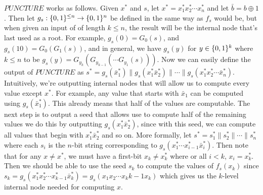 \documentclass{article}
\begin{document}
\begin{enumerate}
\begin{enumerate}[,label=\alph*.]
$PUNCTURE$ works as follows. Given $x^*$ and $s$, let $x^* = x^*_1 x^*_2 \cdots x^*_n$ and let $\bar{b} = b \oplus 1$. 
Then let $g_s: \{0,1\}^{\leq n} \to \{0,1\}^n$ be defined in the same way as $f_s$ would be, but when given an
input of of length $k \leq n$, the result will be the internal node that's last used as a root. For
example, $g_s(0) = G_0(s)$, and $g_s(10) = G_0(G_1(s))$, and in general, we have $g_s(y)$ for $y \in \{0,1\}^k$
where $k \leq n$ to be $g_s(y) = G_{y_k}(G_{y_{k-1}}(\cdots G_{y_1}(s)))$. Now we can easily
define the output of $PUNCTURE$ as $s^* = g_s(\bar{x}_1^*) \| g_s(x_1^*\bar{x}_2^*) \| \cdots  \| g_s(x_1^*x_2^* \cdots \bar{x}_{n}^*)$.
Intuitively, we're outputting internal nodes that will allow us to compute every value except $x^*$.
For example, any value that starts with $\bar{x}_1$ can be computed using $g_s(\bar{x}_1^*)$. This
already means that half of the values are computable. The next step is to output a seed that allows
use to compute half of the remaining
values \textendash{} we do this by outputting $g_s(x_1^*\bar{x}_2^*)$, since with this seed, we can compute
all values that begin with $x_1^*\bar{x}_2^*$ and so on. More formally, let $s^* = s_1^* \| s_2^* \| \cdots \| s_n^*$
where each $s_i$ is the $n$-bit string corresponding to $g_s(x_1^*\cdots x_{i-1}^*\bar{x}_i^*)$. Then
note that for any $x \neq x^*$, we must have a first-bit $x_k \neq x_k^*$ where or all $i < k$, $x_i = x_k^*$. 
Then we should be able to use the seed $s_k$ to compute the values of $f_s(x_k)$ since 
$s_k = g_s(x_1^*x_2^*\cdots x_{k-1}^*\bar{x}_k^*) = g_s(x_1x_2\cdots x_k{k-1}x_{k})$ which gives
us the $k$-level internal node needed for computing $x$.%


\end{enumerate}
\end{enumerate}
\end{document}
